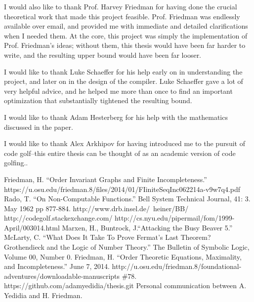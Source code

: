 \documentclass[11pt]{report}
\begin{document}
I would also like to thank Prof. Harvey Friedman for having done the crucial theoretical work that made this project feasible. Prof. Friedman was endlessly available over email, and provided me with immediate and detailed clarifications when I needed them. At the core, this project was simply the implementation of Prof. Friedman's ideas; without them, this thesis would have been far harder to write, and the resulting upper bound would have been far looser.

I would like to thank Luke Schaeffer for his help early on in understanding the project, and later on in the design of the compiler. Luke Schaeffer gave a lot of very helpful advice, and he helped me more than once to find an important optimization that substantially tightened the resulting bound.

I would like to thank Adam Hesterberg for his help with the mathematics discussed in the paper.

I would like to thank Alex Arkhipov for having introduced me to the pursuit of code golf--this entire thesis can be thought of as an academic version of code golfing..


\begin{thebibliography}{100}
 Friedman, H. ``Order Invariant Graphs and Finite Incompleteness.'' https://u.osu.edu/friedman.8/files/2014/01/FIiniteSeqInc062214a-v9w7q4.pdf
 Rado, T. ``On Non-Computable Functions.'' 
Bell System Technical Journal, 41: 3. May 1962 pp 877-884.
 http://www.drb.insel.de/~heiner/BB/
 http://codegolf.stackexchange.com/
 http://cs.nyu.edu/pipermail/fom/1999-April/003014.html
 Marxen, H., Buntrock, J.``Attacking the Busy Beaver 5.'' 
 McLarty, C. ``What Does It Take To Prove Fermat's Last Theorem? Grothendieck and the Logic of Number Theory.'' The Bulletin of Symbolic Logic, Volume 00, Number 0.
 Friedman, H. ``Order Theoretic Equations, Maximality, and Incompleteness.'' June 7, 2014. http://u.osu.edu/friedman.8/foundational-adventures/downloadable-manuscripts \#78.
 https://github.com/adamyedidia/thesis.git
 Personal communication between A. Yedidia and H. Friedman.
\end{thebibliography}
\end{document}
